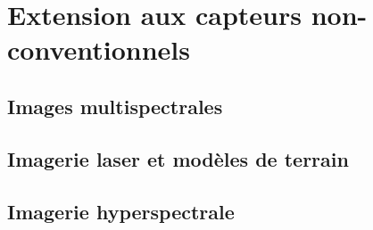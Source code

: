 \chapter{Extension aux capteurs non-conventionnels}

\section{Images multispectrales}

\section{Imagerie laser et modèles de terrain}

\section{Imagerie hyperspectrale}

